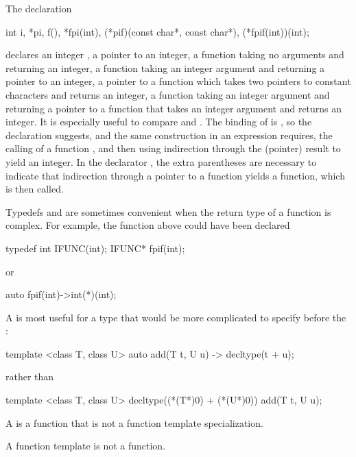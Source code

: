 \pnum
\begin{example}
The declaration
\begin{codeblock}
int i,
    *pi,
    f(),
    *fpi(int),
    (*pif)(const char*, const char*),
    (*fpif(int))(int);
\end{codeblock}
declares an integer
,
a pointer
to an integer,
a function
taking no arguments and returning an integer,
a function
taking an integer argument and returning a pointer to an integer,
a pointer
to a function which
takes two pointers to constant characters and returns an integer,
a function
taking an integer argument and returning a pointer to a function that takes an integer argument and returns an integer.
It is especially useful to compare
and
.
The binding of
is
,
so the declaration suggests,
and the same construction in an expression
requires, the calling of a function
,
and then using indirection through the (pointer) result
to yield an integer.
In the declarator
,
the extra parentheses are necessary to indicate that indirection through
a pointer to a function yields a function, which is then called.
\end{example}
\begin{note}
Typedefs and  are sometimes convenient when the return type of a function is complex.
For example,
the function
above could have been declared
\begin{codeblock}
typedef int  IFUNC(int);
IFUNC*  fpif(int);
\end{codeblock}
or
\begin{codeblock}
auto fpif(int)->int(*)(int);
\end{codeblock}

A  is most useful for a type that would be more complicated to specify before the :
\begin{codeblock}
template <class T, class U> auto add(T t, U u) -> decltype(t + u);
\end{codeblock}
rather than
\begin{codeblock}
template <class T, class U> decltype((*(T*)0) + (*(U*)0)) add(T t, U u);
\end{codeblock}
\end{note}

\pnum
A  is a function that is not a function template
specialization.
\begin{note}
A function template is not a function.
\end{note}


